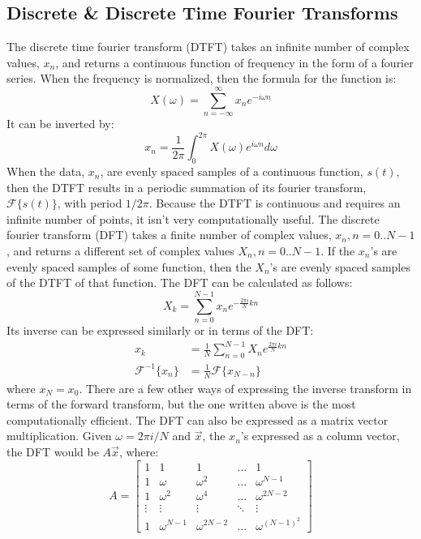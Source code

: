 \subsection{Discrete \& Discrete Time Fourier Transforms}
The discrete time fourier transform (DTFT) takes an infinite number of complex values, $x_n$, and returns a continuous function of frequency in the form of a fourier series. When the frequency is normalized, then the formula for the function is:
\[X(\omega)=\sum_{n=-\infty}^\infty x_n e^{-i\omega n}\]
It can be inverted by:
\[x_n=\frac{1}{2\pi}\int_0^{2\pi}X(\omega)e^{i\omega n}d\omega\]
When the data, $x_n$, are evenly spaced samples of a continuous function, $s(t)$, then the DTFT results in a periodic summation of its fourier transform, $\mathcal{F}\{s(t)\}$, with period $1/{2\pi}$. Because the DTFT is continuous and requires an infinite number of points, it isn't very computationally useful. The discrete fourier transform (DFT) takes a finite number of complex values, $x_n, n=0..N-1$, and returns a different set of complex values $X_n, n=0..N-1$. If the $x_n$'s are evenly spaced samples of some function, then the $X_n$'s are evenly spaced samples of the DTFT of that function. The DFT can be calculated as follows:
\[X_k=\sum_{n=0}^{N-1}x_n e^{-\frac{2\pi i}{N}kn}\]
Its inverse can be expressed similarly or in terms of the DFT:
\begin{align*}
	x_k&=\frac{1}{N}\sum_{n=0}^{N-1}X_n e^{\frac{2\pi i}{N}kn} \\
	\mathcal{F}^{-1}\{x_n\}&=\frac{1}{N}\mathcal{F}\{x_{N-n}\}
\end{align*}
where $x_N=x_0$. There are a few other ways of expressing the inverse transform in terms of the forward transform, but the one written above is the most computationally efficient. The DFT can also be expressed as a matrix vector multiplication. Given $\omega=2\pi i /N$ and $\vec{x}$, the $x_n$'s expressed as a column vector, the DFT would be $A\vec{x}$, where:
\[A=
\begin{bmatrix}
1      & 1            & 1             & \dots  & 1                \\
1      & \omega       & \omega^2      & \dots  & \omega^{N-1}     \\
1      & \omega^2     & \omega^4      & \dots  & \omega^{2N-2}    \\
\vdots & \vdots       & \vdots        & \ddots & \vdots           \\
1      & \omega^{N-1} & \omega^{2N-2} & \dots  & \omega^{(N-1)^2}
\end{bmatrix}\]
